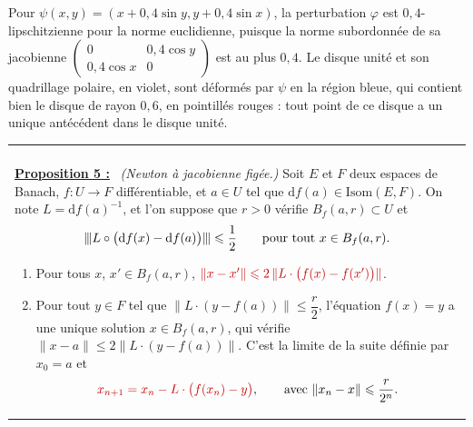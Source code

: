 \documentclass[a4paper,twoside]{report}
\makeatletter
\newcommand{\rmath}[1]{\textcolor{rougecours}{#1}}
\newenvironment{cadre}%
 {\par\vspace{2mm}\noindent\begin{tabular}{|@{\hspace{4mm}}p{0.93\textwidth}@{\hspace{4mm}}|}
  \hline \\[-2mm]}%
 {\\[2mm] \hline \end{tabular}\par\vspace{3mm}}
\newcommand{\propo}[1]{\textbf{\underline{Proposition #1 :}}~}
\newcommand{\dd}{\mathrm{d}}                      %
\newcommand{\norme}[1]{\lVert #1 \rVert}         %
\newcommand{\nop}[1]{|\mkern-1.5mu|\mkern-1.5mu|#1|\mkern-1.5mu|\mkern-1.5mu|}   %
\newcommand{\Bf}{B_{f}}                           %
\newcommand{\Isom}{\mathrm{Isom}}                 %
\makeatother
\begin{document}
\noindent Pour $\psi(x, y) = (x + 0{,}4\sin y, y + 0{,}4\sin x)$, la perturbation $\varphi$ est $0{,}4$-lipschitzienne pour la norme euclidienne, puisque la norme subordonnée de sa jacobienne $\begin{pmatrix} 0 & 0{,}4\cos y \\ 0{,}4\cos x & 0 \end{pmatrix}$ est au plus $0{,}4$. Le disque unité et son quadrillage polaire, en violet, sont déformés par $\psi$ en la région bleue, qui contient bien le disque de rayon $0{,}6$, en pointillés rouges : tout point de ce disque a un unique antécédent dans le disque unité.

\begin{cadre}
\propo{5} \emph{(Newton à jacobienne figée.)} Soit $E$ et $F$ deux espaces de Banach, $f : U \to F$ différentiable, et $a \in U$ tel que $\dd f(a) \in \Isom(E, F)$. On note $L = \dd f(a)^{-1}$, et l'on suppose que $r > 0$ vérifie $\Bf(a, r) \subset U$ et
\[ \nop{L \circ \big(\dd f(x) - \dd f(a)\big)} \leqslant \frac{1}{2} \qquad \text{pour tout } x \in \Bf(a, r). \]
\begin{enumerate}[label=(\roman*),topsep=3pt,itemsep=2pt]
  \item Pour tous $x$, $x' \in \Bf(a, r)$, $\rmath{\norme{x - x'} \leqslant 2\,\norme{L\cdot\big(f(x) - f(x')\big)}}$.
  \item Pour tout $y \in F$ tel que $\norme{L\cdot(y - f(a))} \leqslant \dfrac{r}{2}$, l'équation $f(x) = y$ a une unique solution $x \in \Bf(a, r)$, qui vérifie $\norme{x - a} \leqslant 2\norme{L\cdot(y - f(a))}$. C'est la limite de la suite définie par $x_{0} = a$ et
  \[ \rmath{x_{n + 1} = x_{n} - L\cdot\big(f(x_{n}) - y\big)}, \qquad \text{avec } \norme{x_{n} - x} \leqslant \frac{r}{2^{n}}. \]
\end{enumerate}
\end{cadre}
\end{document}
